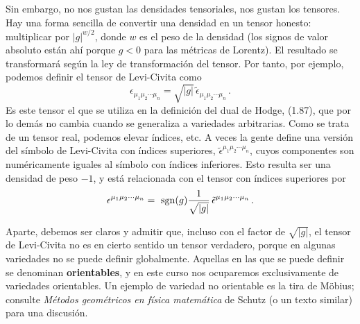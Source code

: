 \documentclass[11pt,b5paper,openany,twoside]{book}
\begin{document}
Sin embargo, no nos gustan las densidades tensoriales, nos gustan los tensores.
Hay una forma sencilla de convertir una densidad en un tensor honesto: multiplicar por $|g|^{w/2}$, donde $w$ es el peso de la densidad (los signos de valor absoluto están ahí porque $g<0$ para las métricas de Lorentz).
El resultado se transformará según la ley de transformación del tensor.
Por tanto, por ejemplo, podemos definir el tensor de Levi-Civita como
\begin{equation}
\epsilon_{\mu_1\mu_2\cdots\mu_n}= \sqrt{|g|}\,
\tilde\epsilon_{\mu_1\mu_2\cdots\mu_n}\,.\label{2.42}
\end{equation}
Es este tensor el que se utiliza en la definición del dual de Hodge, (1.87), que por lo demás no cambia cuando se generaliza a variedades arbitrarias.
Como se trata de un tensor real, podemos elevar índices, etc.
A veces la gente define una versión del símbolo de Levi-Civita con índices superiores, $\tilde\epsilon^{\mu_1\mu_2\cdots\mu_n}$, cuyos componentes son numéricamente iguales al símbolo con índices inferiores.
Esto resulta ser una densidad de peso $-1$, y está relacionada con el tensor con índices superiores por
\begin{equation}
\epsilon^{\mu_1\mu_2\cdots\mu_n} = {\rm ~sgn}(g){1\over{\sqrt{|g|}}}
\,\tilde\epsilon^{\mu_1\mu_2\cdots\mu_n}\,.\label{2.43}
\end{equation}

Aparte, debemos ser claros y admitir que, incluso con el factor de $\sqrt{|g|}$, el tensor de Levi-Civita no es en cierto sentido un tensor verdadero, porque en algunas variedades no se puede definir globalmente.
Aquellas en las que se puede definir se denominan {\bf orientables}, y en este curso nos ocuparemos exclusivamente de variedades orientables.
Un ejemplo de variedad no orientable es la tira de Möbius; consulte {\sl Métodos geométricos en física matemática} de Schutz (o un texto similar) para una discusión.
\end{document}
